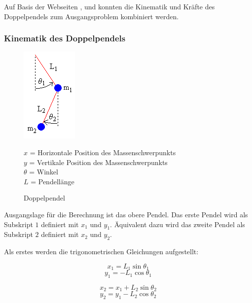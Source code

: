 \documentclass[12pt]{article}
\numberwithin{equation}{subsection}
\begin{document}
Auf Basis der Webseiten \citep{neumann04a}, \citep{kramann11} und \citep{weissstein07} konnten die Kinematik und Kräfte des Doppelpendels zum Ausgangsproblem kombiniert werden. 

\subsubsection{Kinematik des Doppelpendels}
\begin{figure}[H]
	\begin{minipage}[!b]{0.4\textwidth}
		\centering
		\includegraphics[scale=1]{dbl_pendulum.png}
		\caption[Doppelpendel]{Doppelpendel \citep{neumann04a}}
		\label{fig:energy}
	\end{minipage}
	\begin{minipage}[!t]{\textwidth}
		\vspace{0pt}\raggedright
		$x$ = Horizontale Position des Massenschwerpunkts\\
		$y$ = Vertikale Position des Massenschwerpunkts\\
		$\theta$ = Winkel\\
		$L$ = Pendellänge
	\end{minipage}
\end{figure}

Ausgangslage für die Berechnung ist das obere Pendel. Das erste Pendel wird als Subskript $1$ definiert mit $x_1$ und $y_1$. Äquivalent dazu wird das zweite Pendel als Subskript $2$ definiert mit $x_2$ und $y_2$.

Als erstes werden die trigonometrischen Gleichungen aufgestellt:

\begin{equation} \label{eq:energy:1_1}
	x_1 = L_1\sin\theta_1
\end{equation}
\begin{equation} \label{eq:energy:1_2}
	y_1 = -L_1\cos\theta_1
\end{equation}

\begin{equation} \label{eq:energy:2_1}
	x_2 = x_1 + L_2\sin\theta_2
\end{equation}
\begin{equation} \label{eq:energy:2_2}
	y_2 = y_1 - L_2\cos\theta_2
\end{equation}
\end{document}
